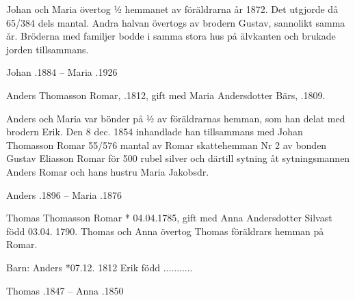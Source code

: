 Johan och Maria övertog ½ hemmanet av föräldrarna år 1872. Det utgjorde då 65/384 dels mantal. Andra halvan övertogs av brodern Gustav, sannolikt samma år. Bröderna med familjer bodde i samma stora hus på älvkanten och brukade jorden tillsammans.

Johan .1884  --  Maria .1926



Anders Thomasson Romar, .1812, gift med Maria Andersdotter Bärs, .1809.
\begin{jhchildren}
  \item {}
  \item {}
  \item {}
  \item {}
  \item {}
  \item {}
  \item {}
  \item {}
\end{jhchildren}

Anders och Maria var bönder på ½ av föräldrarnas hemman, som han delat med brodern Erik. Den 8 dec. 1854 inhandlade han tillsammans med Johan Thomasson Romar 55/576 mantal av Romar skattehemman Nr 2 av bonden Gustav Eliasson Romar för 500 rubel silver och därtill sytning åt sytningsmannen Anders Romar och hans hustru Maria Jakobsdr.

Anders .1896  --  Maria .1876



Thomas Thomasson Romar * 04.04.1785, gift med Anna Andersdotter Silvast född 03.04. 1790.
Thomas och Anna övertog Thomas föräldrars hemman på Romar.
\begin{jhchildren}
  \item {}
  \item {}
\end{jhchildren}

Barn:  Anders  *07.12. 1812
Erik         född ...........

Thomas .1847  --  Anna .1850


